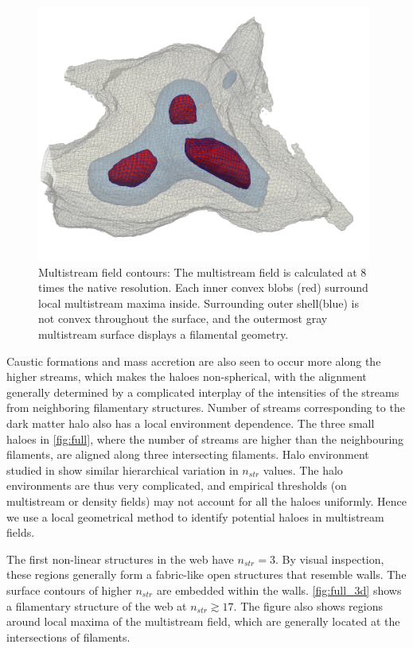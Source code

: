 \begin{figure} 
\centering\includegraphics[width=11cm]{Chapter5/Source_v2/fig2.pdf} 
\caption{Multistream field contours: The multistream field is calculated at 8 times the native resolution. Each inner convex blobs (red) surround local multistream maxima inside. Surrounding outer shell(blue) is not convex throughout the surface, and the outermost gray multistream surface displays a filamental geometry.}
\label{fig:full}
\end{figure}


Caustic formations and mass accretion are also seen to occur more along the higher streams, which makes the haloes non-spherical, with the alignment generally determined by a complicated interplay  of the intensities of the streams from neighboring filamentary structures. Number of streams corresponding to the dark matter halo also has a local environment dependence. The three small haloes in \autoref{fig:full}, where the number of streams are higher than the neighbouring filaments, are aligned along three intersecting filaments. Halo environment studied in \cite{Ramachandra2015} show similar hierarchical variation in $n_{str}$ values. The halo environments are thus very complicated, and empirical thresholds (on multistream or density fields) may not account for all the haloes uniformly. Hence we use a local geometrical method to identify potential haloes in multistream fields.


The first non-linear structures in the web have $n_{str} = 3$. By visual inspection, these regions generally form a fabric-like open structures that resemble walls. The surface contours of higher $n_{str}$ are embedded within the walls. \autoref{fig:full_3d} shows a filamentary structure of the web at $n_{str} \gtrsim 17$. The figure also shows regions around local maxima of the multistream field, which are generally located at the intersections of filaments.    








